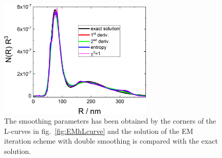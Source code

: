 \begin{figure}[htb]
\centering
\includegraphics[width=0.65\textwidth]{../images/form_factor/EM/EMsmoothNRR3.png}
\caption{The smoothing parameters has been obtained by the corners of the L-curves in fig.\ \ref{fig:EMhLcurve} and the solution of the EM iteration scheme with double smoothing is compared with the exact solution.\label{fig:EMsmoothNRR3}}
\end{figure}

~\\

